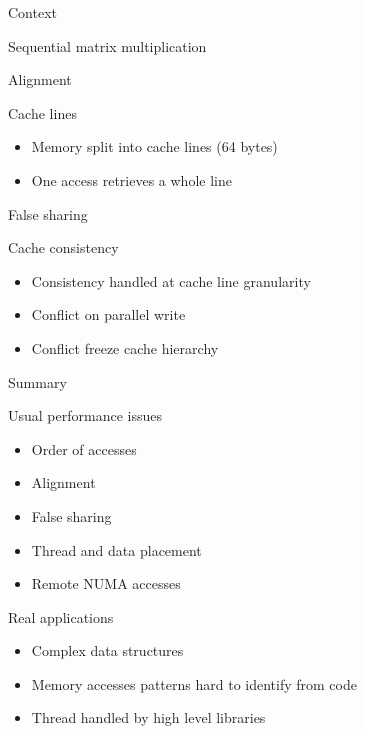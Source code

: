 \documentclass[xcolor={usenames,dvipsnames},hyperref={pdfusetitle}]{beamer}
\begin{document}
\begin{section}{Context}
\begin{frame}{Sequential matrix multiplication}
    \centering
    \scalebox{.6}{
        
    }
\end{frame}

\begin{frame}{Alignment}
    \hspace{-40pt}
    \scalebox{.8}{
        
    }
    \begin{block}{Cache lines}
        \begin{itemize}
            \item Memory split into cache lines (64 bytes)
            \item<alert@1-> One access retrieves a whole line
        \end{itemize}
    \end{block}
\end{frame}

\begin{frame}{False sharing}
    \hspace{-35pt}
    \scalebox{.8}{
        
    }
    \vspace{20pt}
    \begin{block}{Cache consistency}
        \begin{itemize}
            \item Consistency handled at cache line granularity
            \item<alert@1-> Conflict on parallel write
            \item Conflict freeze cache hierarchy
        \end{itemize}
    \end{block}
\end{frame}

\begin{frame}{Summary}
    \begin{block}{Usual performance issues}
        \begin{itemize}
            \item Order of accesses
            \item Alignment
            \item False sharing
            \item Thread and data placement
            \item Remote NUMA accesses
        \end{itemize}
    \end{block}
    \pause
    \begin{alertblock}{Real applications}
        \begin{itemize}
            \item Complex data structures
            \item Memory accesses patterns hard to identify from code
            \item Thread handled by high level libraries
        \end{itemize}
    \end{alertblock}
\end{frame}


\end{section}
\end{document}
